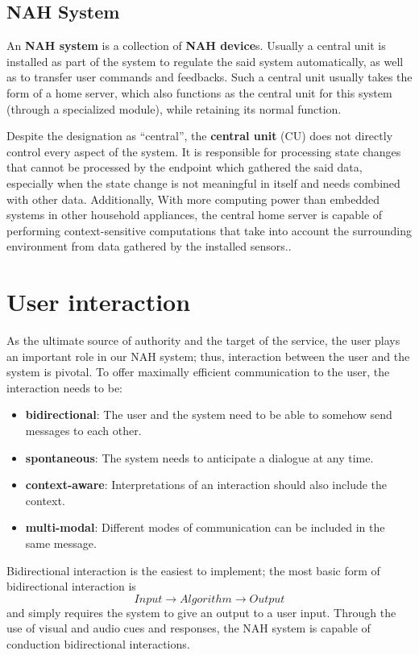 \documentclass[letterpaper, twocolumn, 10pt, conference]{IEEEtran}
\newcommand{\term}[1]{\textbf{#1}}
\begin{document}
\subsection*{NAH System}

An \term{NAH system} is a collection of \term{NAH device}s. Usually a central unit is installed as part of the system to regulate the said system automatically, as well as to transfer user commands and feedbacks. Such a central unit usually takes the form of a home server, which also functions as the central unit for this system (through a specialized module), while retaining its normal function. 

Despite the designation as \enquote{central}, the \term{central unit} (CU) does not directly control every aspect of the system. It is responsible for processing state changes that cannot be processed by the endpoint which gathered the said data, especially when the state change is not meaningful in itself and needs combined with other data. Additionally, With more computing power than embedded systems in other household appliances, the central home server is capable of performing context-sensitive computations that take into account the surrounding environment from data gathered by the installed sensors..

\section{User interaction} \label{sec:user_interaction}

As the ultimate source of authority and the target of the service, the user plays an important role in our NAH system; thus, interaction between the user and the system is pivotal. To offer maximally efficient communication to the user, the interaction needs to be:
\begin{itemize}
	\setlength\itemsep{0pt}
	\item \term{bidirectional}: The user and the system need to be able to somehow send messages to each other.
	\item \term{spontaneous}: The system needs to anticipate a dialogue at any time.
	\item \term{context-aware}: Interpretations of an interaction should also include the context.
	\item \term{multi-modal}: Different modes of communication can be included in the same message.
\end{itemize}

Bidirectional interaction is the easiest to implement; the most basic form of bidirectional interaction is \[ Input \rightarrow Algorithm \rightarrow Output\] and simply requires the system to give an output to a user input. Through the use of visual and audio cues and responses, the NAH system is capable of conduction bidirectional interactions.
\end{document}
